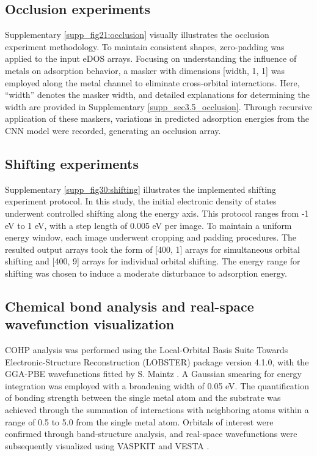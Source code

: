 \subsection{Occlusion experiments}
Supplementary \cref{supp_fig21:occlusion} visually illustrates the occlusion experiment methodology.
To maintain consistent shapes, zero-padding was applied to the input eDOS arrays.
Focusing on understanding the influence of metals on adsorption behavior, a masker with dimensions [width, 1, 1] was employed along the metal channel to eliminate cross-orbital interactions.
Here, ``width'' denotes the masker width, and detailed explanations for determining the width are provided in Supplementary \cref{supp_sec3.5_occlusion}.
Through recursive application of these maskers, variations in predicted adsorption energies from the CNN model were recorded, generating an occlusion array.

\subsection{Shifting experiments}
Supplementary \cref{supp_fig30:shifting} illustrates the implemented shifting experiment protocol.
In this study, the initial electronic density of states underwent controlled shifting along the energy axis.
This protocol ranges from -1 eV to 1 eV, with a step length of 0.005 eV per image.
To maintain a uniform energy window, each image underwent cropping and padding procedures.
The resulted output arrays took the form of [400, 1] arrays for simultaneous orbital shifting and [400, 9] arrays for individual orbital shifting.
The energy range for shifting was chosen to induce a moderate disturbance to adsorption energy.

\subsection{Chemical bond analysis and real-space wavefunction visualization}
COHP analysis was performed using the Local-Orbital Basis Suite Towards Electronic-Structure Reconstruction (LOBSTER) package  \cite{deringer2011crystal, koga1999analytical, nelson2020lobster, maintz2013analytic, dronskowski1993crystal} version 4.1.0, with the GGA-PBE wavefunctions fitted by S. Maintz \cite{koga1999analytical, maintz2016lobster}.
A Gaussian smearing for energy integration was employed with a broadening width of 0.05 eV.
The quantification of bonding strength between the single metal atom and the substrate was achieved through the summation of interactions with neighboring atoms within a range of 0.5 \text{\AA} to 5.0 \text{\AA} from the single metal atom.
Orbitals of interest were confirmed through band-structure analysis, and real-space wavefunctions were subsequently visualized using VASPKIT \cite{wang2021vaspkit} and VESTA \cite{momma2008vesta}.

